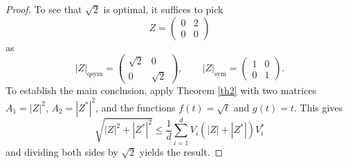 \documentclass[10pt,a4paper]{amsart}
\newcommand{\qsym}{\mathrm{qsym}}
\newcommand{\sym}{\mathrm{sym}}
\begin{document}
\begin{proof} To see that $\sqrt{2}$ is optimal, it suffices to pick
$$
Z=\begin{pmatrix} 0&2 \\ 0&0\end{pmatrix}
$$
as
$$
|Z|_{\qsym} =  \begin{pmatrix} \sqrt{2}&0 \\ 0&\sqrt{2}\end{pmatrix}, \qquad |Z|_{\sym} =  \begin{pmatrix} 1&0 \\ 0&1\end{pmatrix}.
$$
To establish the main conclusion, apply Theorem \ref{th2} with two matrices $A_1=|Z|^2$, $A_2=|Z^*|^2$, and the functions $f(t)=\sqrt{t}$ and $g(t)=t$. This gives
$$
\sqrt{|Z|^2+|Z^*|^2} \le \frac{ 1}{d}  \sum_{i=1}^d V_i \left(|Z|+|Z^*|\right)V_i^*
$$
and dividing both sides by $\sqrt{2}$ yields the result.
\end{proof}
\end{document}
